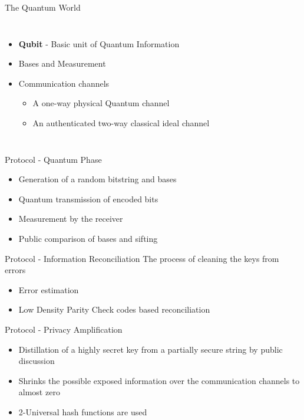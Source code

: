 \documentclass{beamer}
\begin{document}
\begin{frame}{The Quantum World}
     \begin{columns}
                \centering
            \begin{itemize}[<+->]
                \item \textbf{Qubit} - Basic unit of Quantum Information
                \item Bases and Measurement
                \item Communication channels
                      \begin{itemize}
                            \item A one-way physical Quantum channel
                            \item An authenticated two-way classical ideal channel
                      \end{itemize}
                \end{itemize}
    \end{columns}
\end{frame}


\begin{frame}{Protocol - Quantum Phase}
    \begin{itemize}[<+->]
        \item Generation of a random bitstring and bases 
		\item Quantum transmission of encoded bits
		\item Measurement by the receiver
		\item Public comparison of bases and sifting
	\end{itemize}
\end{frame}


\begin{frame}{Protocol - Information Reconciliation}
	The process of cleaning the keys from errors
	\begin{itemize}[<+->]
		\item Error estimation
		\item Low Density Parity Check codes based reconciliation
	\end{itemize}
\end{frame}


\begin{frame}{Protocol - Privacy Amplification}
	\begin{itemize}[<+->]
	    \item Distillation of a highly secret key from a partially secure string by public discussion
		\item Shrinks the possible exposed information over the communication channels to almost zero
		\item 2-Universal hash functions are used
	\end{itemize}
\end{frame}
\end{document}
